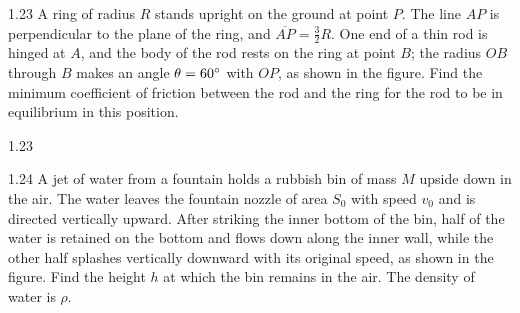 \begin{problem}{1.23}
A ring of radius $R$ stands upright on the ground at point $P$. The line $AP$ is perpendicular to the plane of the ring, and $\overline{AP}=\frac32R$. One end of a thin rod is hinged at $A$, and the body of the rod rests on the ring at point $B$; the radius $OB$ through $B$ makes an angle $\theta=60^{\circ}$ with $OP$, as shown in the figure. Find the minimum coefficient of friction between the rod and the ring for the rod to be in equilibrium in this position.
\end{problem}

\begin{figbox}{1.23}
\end{figbox}

\begin{problem}{1.24}
A jet of water from a fountain holds a rubbish bin of mass $M$ upside down in the air. The water leaves the fountain nozzle of area $S_0$ with speed $v_0$ and is directed vertically upward. After striking the inner bottom of the bin, half of the water is retained on the bottom and flows down along the inner wall, while the other half splashes vertically downward with its original speed, as shown in the figure. Find the height $h$ at which the bin remains in the air. The density of water is $\rho$.
\end{problem}


